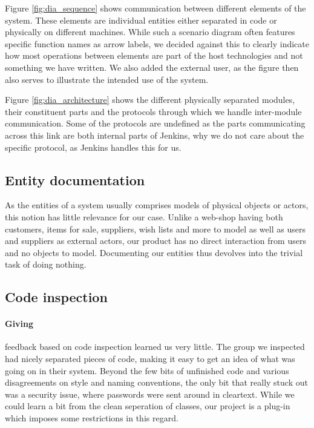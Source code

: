 \documentclass[a4paper]{article}
\begin{document}
Figure \ref{fig:dia_sequence} shows communication between different elements of
the system. These elements are individual entities either separated in code or
physically on different machines. While such a scenario diagram often features
specific function names as arrow labels, we decided against this to clearly
indicate how most operations between elements are part of the host technologies
and not something we have written. We also added the external user, as the figure
then also serves to illustrate the intended use of the system.

Figure \ref{fig:dia_architecture} shows the different physically separated modules,
their constituent parts and the protocols through which we handle inter-module
communication. Some of the protocols are undefined as the parts communicating
across this link are both internal parts of Jenkins, why we do not care about the
specific protocol, as Jenkins handles this for us. 

\subsection{Entity documentation}
As the entities of a system usually comprises models of physical objects or actors,
this notion has little relevance for our case. Unlike a web-shop having both
customers, items for sale, suppliers, wish lists and more to model as well as
users and suppliers as external actors, our product has no direct interaction from
users and no objects to model. Documenting our entities thus devolves into the
trivial task of doing nothing.



\subsection{Code inspection}
\label{sec:inspection}
\paragraph{Giving} feedback based on code inspection learned us very little. The
group we inspected had nicely separated pieces of code, making it easy to get an
idea of what was going on in their system. Beyond the few bits of unfinished code
and various disagreements on style and naming conventions, the only bit that
really stuck out was a security issue, where passwords were sent around in
cleartext. While we could learn a bit from the clean seperation of classes, our
project is a plug-in which imposes some restrictions in this regard.
\end{document}
